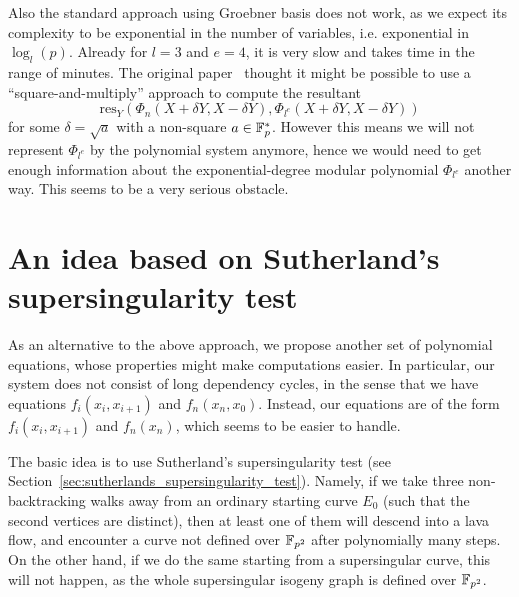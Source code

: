 Also the standard approach using Groebner basis does not work, as we expect its complexity to be exponential in the number of variables, i.e. exponential in $\log_l(p)$.
Already for $l = 3$ and $e = 4$, it is very slow and takes time in the range of minutes.
The original paper~\cite{base_paper} thought it might be possible to use a ``square-and-multiply'' approach to compute the resultant
\begin{equation*}
    \mathrm{res}_Y(\Phi_n(X + \delta Y, X - \delta Y), \Phi_{l^e}(X + \delta Y, X - \delta Y))
\end{equation*}
for some $\delta = \sqrt{a}$ with a non-square $a \in \mathbb{F}_p^*$.
However this means we will not represent $\Phi_{l^e}$ by the polynomial system anymore, hence we would need to get enough information about the exponential-degree modular polynomial $\Phi_{l^e}$ another way.
This seems to be a very serious obstacle.

\section{An idea based on Sutherland's supersingularity test}
As an alternative to the above approach, we propose another set of polynomial equations, whose properties might make computations easier.
In particular, our system does not consist of long dependency cycles, in the sense that we have equations $f_i(x_i, x_{i + 1})$ and $f_n(x_n, x_0)$.
Instead, our equations are of the form $f_i(x_i, x_{i + 1})$ and $f_n(x_n)$, which seems to be easier to handle.

The basic idea is to use Sutherland's supersingularity test (see Section~\ref{sec:sutherlands_supersingularity_test}).
Namely, if we take three non-backtracking walks away from an ordinary starting curve $E_0$ (such that the second vertices are distinct), then at least one of them will descend into a lava flow, and encounter a curve not defined over $\mathbb{F}_{p^2}$ after polynomially many steps.
On the other hand, if we do the same starting from a supersingular curve, this will not happen, as the whole supersingular isogeny graph is defined over $\mathbb{F}_{p^2}$.

